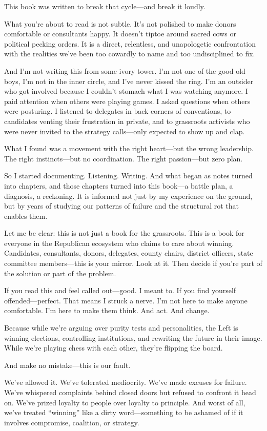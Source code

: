 \documentclass[12pt]{book}
\begin{document}
This book was written to break that cycle—and break it loudly.

What you’re about to read is not subtle. It’s not polished to make donors comfortable or consultants happy. It doesn’t tiptoe around sacred cows or political pecking orders. It is a direct, relentless, and unapologetic confrontation with the realities we’ve been too cowardly to name and too undisciplined to fix.

And I’m not writing this from some ivory tower. I’m not one of the good old boys, I’m not in the inner circle, and I’ve never kissed the ring. I’m an outsider who got involved because I couldn’t stomach what I was watching anymore. I paid attention when others were playing games. I asked questions when others were posturing. I listened to delegates in back corners of conventions, to candidates venting their frustration in private, and to grassroots activists who were never invited to the strategy calls—only expected to show up and clap.

What I found was a movement with the right heart—but the wrong leadership. The right instincts—but no coordination. The right passion—but zero plan.

So I started documenting. Listening. Writing. And what began as notes turned into chapters, and those chapters turned into this book—a battle plan, a diagnosis, a reckoning. It is informed not just by my experience on the ground, but by years of studying our patterns of failure and the structural rot that enables them.

Let me be clear: this is not just a book for the grassroots. This is a book for everyone in the Republican ecosystem who claims to care about winning. Candidates, consultants, donors, delegates, county chairs, district officers, state committee members—this is your mirror. Look at it. Then decide if you’re part of the solution or part of the problem.

If you read this and feel called out—good. I meant to. If you find yourself offended—perfect. That means I struck a nerve. I’m not here to make anyone comfortable. I’m here to make them think. And act. And change.

Because while we’re arguing over purity tests and personalities, the Left is winning elections, controlling institutions, and rewriting the future in their image. While we’re playing chess with each other, they’re flipping the board.

And make no mistake—this is our fault.

We’ve allowed it. We’ve tolerated mediocrity. We’ve made excuses for failure. We’ve whispered complaints behind closed doors but refused to confront it head on. We’ve prized loyalty to people over loyalty to principle. And worst of all, we’ve treated “winning” like a dirty word—something to be ashamed of if it involves compromise, coalition, or strategy.
\end{document}
